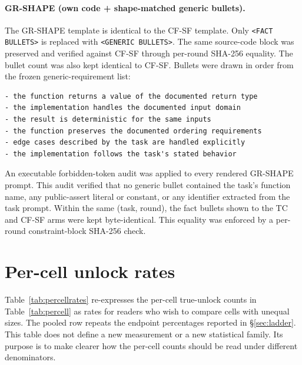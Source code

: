 \documentclass{article}
\numberwithin{equation}{section}  %
\newcommand{\fitwidth}[1]{\resizebox{\ifdim\width>\linewidth \linewidth\else\width\fi}{!}{#1}}
\theoremstyle{definition}
\newcommand{\armP}{\textsf{P}}
\newcommand{\armB}{\textsf{B}}
\newcommand{\armTC}{\textsf{TC}}
\newcommand{\armCF}{\textsf{CF-SF}}
\newcommand{\armGR}{\textsf{GR-SHAPE}}
\begin{document}
\paragraph{\armGR{} (own code + shape-matched generic bullets).}
The \armGR{} template is identical to the \armCF{} template. Only
\texttt{<FACT BULLETS>} is replaced with \texttt{<GENERIC BULLETS>}. The same source-code
block was preserved and verified against \armCF{} through per-round SHA-256 equality. The
bullet count was also kept identical to \armCF{}. Bullets were drawn in order from the frozen
generic-requirement list:
{\small\begin{verbatim}
- the function returns a value of the documented return type
- the implementation handles the documented input domain
- the result is deterministic for the same inputs
- the function preserves the documented ordering requirements
- edge cases described by the task are handled explicitly
- the implementation follows the task's stated behavior
\end{verbatim}}
An executable forbidden-token audit was applied to every rendered \armGR{} prompt. This audit
verified that no generic bullet contained the task's function name, any public-assert literal
or constant, or any identifier extracted from the task prompt. Within the same (task, round),
the fact bullets shown to the \armTC{} and \armCF{} arms were kept byte-identical. This
equality was enforced by a per-round constraint-block SHA-256 check.

\section{Per-cell unlock rates}
\label{app:rates}

Table~\ref{tab:percellrates} re-expresses the per-cell true-unlock counts in
Table~\ref{tab:percell} as rates for readers who wish to compare cells with unequal sizes.
The pooled row repeats the endpoint percentages reported in \S\ref{sec:ladder}. This table
does not define a new measurement or a new statistical family. Its purpose is to make clearer
how the per-cell counts should be read under different denominators.

\begin{table}[h]
\caption{Per-cell true-unlock rates by arm (percentage of cell units) and the pooled rate over
all 290 units in the final row. Rates are a re-expression of the counts in
Table~\ref{tab:percell}. No new measurement is reported. The pooled ordering is not driven by
a single cell. The per-cell maximum belongs to \armB{} or \armCF{} in five of the six cells.
The only exception is the HE+/deepseek-1.3b cell, where \armTC{} leads with 10.2\%.
\armP{} does not reach the cell maximum in any cell.}
\label{tab:percellrates}
\centering\small
\fitwidth{}
\end{table}
\end{document}
